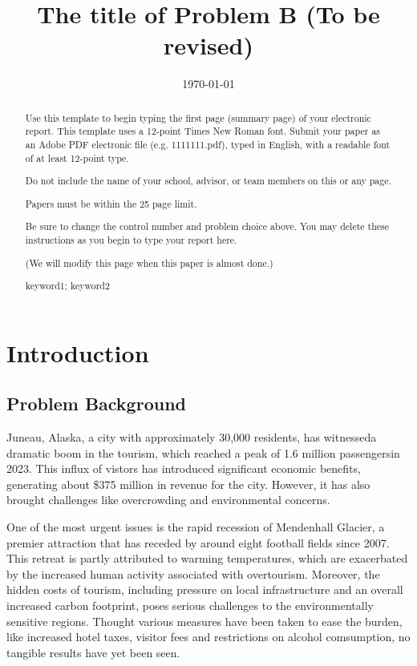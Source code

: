 \documentclass{mcmthesis}
\title{The title of Problem B (To be revised)}
\author{\small \href{https://www.latexstudio.net/}}
\date{\today}
\begin{document}
\begin{abstract}
\par 
Use this template to begin typing the first page (summary page) of your electronic report. This template uses a 12-point Times New Roman font. Submit your paper as an Adobe PDF electronic file (e.g. 1111111.pdf), typed in English, with a readable font of at least 12-point type.

Do not include the name of your school, advisor, or team members on this or any page.

Papers must be within the 25 page limit.

Be sure to change the control number and problem choice above.
You may delete these instructions as you begin to type your report here.

(We will modify this page when this paper is almost done.)
\begin{keywords}
keyword1; keyword2
\end{keywords}
\end{abstract}
\maketitle
\tableofcontents
\newpage
%
\section{Introduction}
\subsection{Problem Background}
Juneau, Alaska, a city with approximately 30,000 residents, has witnesseda dramatic boom in the tourism, which reached a peak of 1.6 million passengersin 2023. 
This influx of vistors has introduced significant economic benefits, generating about \$375 million in revenue for the city. 
However, it has also brought challenges like overcrowding and environmental concerns.

One of the most urgent issues is the rapid recession of Mendenhall Glacier, a premier attraction that has receded by around eight football fields since 2007. 
This retreat is partly attributed to warming temperatures, which are exacerbated by the increased human activity associated with overtourism. 
Moreover, the hidden costs of tourism, including pressure on local infrastructure and an overall increased carbon footprint, poses serious challenges to the environmentally sensitive regions. 
Thought various measures have been taken to ease the burden, like increased hotel taxes, visitor fees and restrictions on alcohol comsumption, no tangible results have yet been seen.
\end{document}
